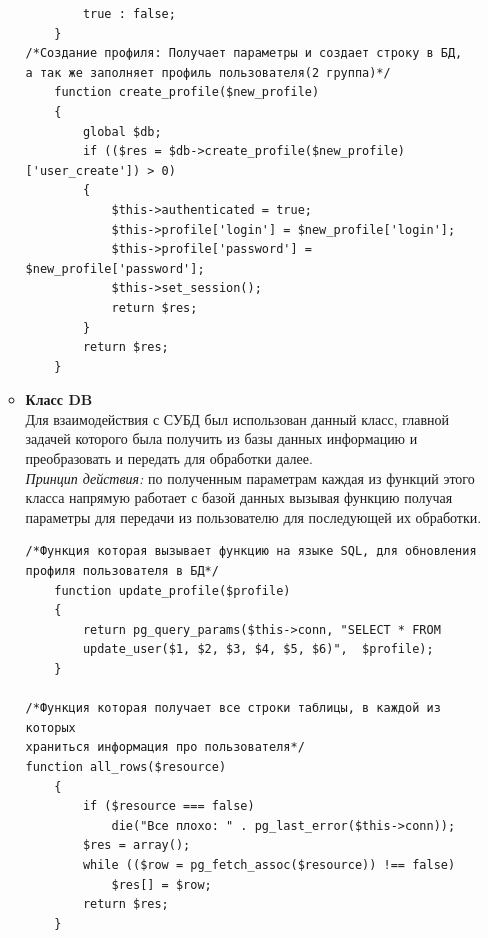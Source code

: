 \documentclass[a4paper]{article}
\begin{document}
\begin{enumerate}
\begin{itemize}
\begin{small}
\begin{verbatim}
        true : false;
    }
/*Создание профиля: Получает параметры и создает строку в БД,
а так же заполняет профиль пользователя(2 группа)*/ 
    function create_profile($new_profile)
    {
        global $db;
        if (($res = $db->create_profile($new_profile)['user_create']) > 0)
        {
            $this->authenticated = true;
            $this->profile['login'] = $new_profile['login'];
            $this->profile['password'] = $new_profile['password'];
            $this->set_session();
            return $res;
        }
        return $res;
    }
\end{verbatim}
\end{small}
\item \textbf{Класс DB}\\
Для взаимодействия с СУБД был использован данный класс, главной задачей которого была получить из базы данных информацию и преобразовать и передать для обработки далее.\\ \textsl{Принцип действия:} по полученным параметрам каждая из функций этого класса напрямую работает с базой данных вызывая функцию получая параметры для передачи из пользователю для последующей их обработки.  
\begin{small}
\begin{verbatim}    
/*Функция которая вызывает функцию на языке SQL, для обновления
профиля пользователя в БД*/
    function update_profile($profile)
    {
        return pg_query_params($this->conn, "SELECT * FROM
        update_user($1, $2, $3, $4, $5, $6)",  $profile);
    }
    
/*Функция которая получает все строки таблицы, в каждой из которых
храниться информация про пользователя*/
function all_rows($resource)
    {
        if ($resource === false)
            die("Все плохо: " . pg_last_error($this->conn));
        $res = array();
        while (($row = pg_fetch_assoc($resource)) !== false)
            $res[] = $row;
        return $res;
    }



\end{verbatim}
\end{small}
\end{itemize}
\end{enumerate}
\end{document}
